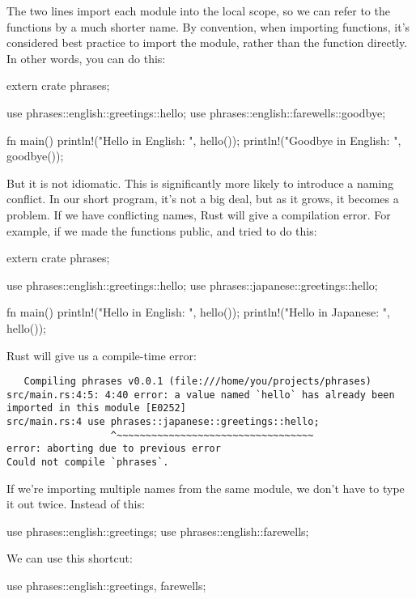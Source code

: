 The two  lines import each module into the local scope, so we can refer to the functions by a much shorter name. By convention, 
when importing functions, it's considered best practice to import the module, rather than the function directly. In other words, you can 
do this:

\begin{rustc}
extern crate phrases;

use phrases::english::greetings::hello;
use phrases::english::farewells::goodbye;

fn main() {
    println!("Hello in English: {}", hello());
    println!("Goodbye in English: {}", goodbye());
}
\end{rustc}

But it is not idiomatic. This is significantly more likely to introduce a naming conflict. In our short program, it's not a big deal, but 
as it grows, it becomes a problem. If we have conflicting names, Rust will give a compilation error. For example, if we made the 
 functions public, and tried to do this:

\begin{rustc}
extern crate phrases;

use phrases::english::greetings::hello;
use phrases::japanese::greetings::hello;

fn main() {
    println!("Hello in English: {}", hello());
    println!("Hello in Japanese: {}", hello());
}
\end{rustc}

Rust will give us a compile-time error:

\begin{verbatim}
   Compiling phrases v0.0.1 (file:///home/you/projects/phrases)
src/main.rs:4:5: 4:40 error: a value named `hello` has already been imported in this module [E0252]
src/main.rs:4 use phrases::japanese::greetings::hello;
                  ^~~~~~~~~~~~~~~~~~~~~~~~~~~~~~~~~~~
error: aborting due to previous error
Could not compile `phrases`.
\end{verbatim}

If we're importing multiple names from the same module, we don't have to type it out twice. Instead of this:

\begin{rustc}
use phrases::english::greetings;
use phrases::english::farewells;
\end{rustc}

We can use this shortcut:

\begin{rustc}
use phrases::english::{greetings, farewells};
\end{rustc}

